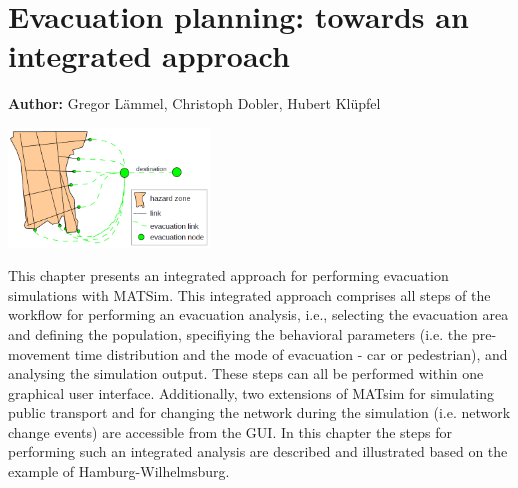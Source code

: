 \chapter{Evacuation planning: towards an integrated approach}
\label{ch:evacuation}

\hfill \textbf{Author:} Gregor L\"ammel, Christoph Dobler, Hubert Kl\"upfel 

\begin{center} \includegraphics[width=0.4\textwidth, angle=0]{extending/figures/Evacuation/evacuation} \end{center}

This chapter presents an integrated approach for performing evacuation simulations with MATSim.
This integrated approach comprises all steps of the workflow for performing an evacuation analysis, i.e., 
selecting the evacuation area and defining the population, specifiying the behavioral parameters 
(i.e. the pre-movement time distribution and the mode of evacuation - car or pedestrian), 
and analysing the simulation output.
These steps can all be performed within one graphical user interface.
Additionally, two extensions of MATsim for simulating public transport and for changing the network 
during the simulation (i.e. network change events) are accessible from the GUI.
In this chapter the steps for performing such an integrated analysis are described and illustrated based on
the example of Hamburg-Wilhelmsburg.


